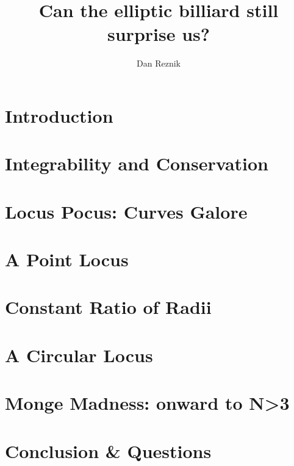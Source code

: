 \documentclass{amsart}
\title{Can the elliptic billiard still surprise us?}
\author{Dan Reznik}
\begin{document}


\section{Introduction}
\label{sec:intro}


\section{Integrability and Conservation}
\label{sec:integrability}


\section{Locus Pocus: Curves Galore}
\label{sec:loci}


\section{A Point Locus}
\label{sec:mitten}


\section{Constant Ratio of Radii}
\label{sec:cosines}


\section{A Circular Locus}
\label{sec:circles}


\section{Monge Madness: onward to N{\textgreater}3}
\label{sec:generalize}


\section{Conclusion \& Questions}
\label{sec:conclusion}




\end{document}
